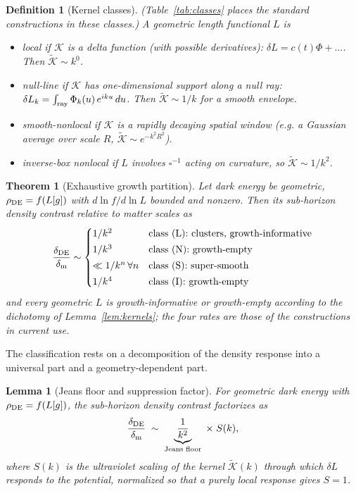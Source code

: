 \documentclass[twocolumn,10pt]{article}
\newtheorem{theorem}{Theorem}
\newtheorem{lemma}{Lemma}
\newtheorem{definition}{Definition}
\newcommand{\dDE}{\delta_{\rm DE}}
\newcommand{\dm}{\delta_{\rm m}}
\begin{document}
\begin{definition}[Kernel classes]
(Table~\ref{tab:classes} places the standard constructions in these classes.)
A geometric length functional $L$ is
\begin{itemize}
\item[\textbf{(L)}] \emph{local} if $\mathcal K$ is a delta function (with
possible derivatives): $\delta L=c(t)\Phi+\dots$. Then
$\widetilde{\mathcal K}\sim k^0$.
\item[\textbf{(N)}] \emph{null-line} if $\mathcal K$ has one-dimensional support
along a null ray: $\delta L_k=\int_{\rm ray}\Phi_k(u)\,e^{iku}\,du$. Then
$\widetilde{\mathcal K}\sim 1/k$ for a smooth envelope.
\item[\textbf{(S)}] \emph{smooth-nonlocal} if $\mathcal K$ is a rapidly
decaying spatial window (e.g. a Gaussian average over scale $R$,
$\widetilde{\mathcal K}\sim e^{-k^2R^2}$).
\item[\textbf{(I)}] \emph{inverse-box nonlocal} if $L$ involves
$\square^{-1}$ acting on curvature, so $\widetilde{\mathcal K}\sim 1/k^2$.
\end{itemize}
\end{definition}

\begin{theorem}[Exhaustive growth partition]
\label{thm:partition}
Let dark energy be geometric, $\rho_{\rm DE}=f(L[g])$ with $d\ln f/d\ln L$
bounded and nonzero. Then its sub-horizon density contrast relative to matter
scales as
\begin{equation}
\frac{\dDE}{\dm}\sim
\begin{cases}
1/k^{2} & \text{class (L): clusters, growth-informative}\\[2pt]
1/k^{3} & \text{class (N): growth-empty}\\[2pt]
\text{$\ll 1/k^{n}\,\forall n$} & \text{class (S): super-smooth}\\[2pt]
1/k^{4} & \text{class (I): growth-empty}
\end{cases}
\label{eq:partition}
\end{equation}
and every geometric $L$ is growth-informative or growth-empty according to the
dichotomy of Lemma~\ref{lem:kernels}; the four rates are those of the
constructions in current use.
\end{theorem}

The classification rests on a decomposition of the density response into a
universal part and a geometry-dependent part.

\begin{lemma}[Jeans floor and suppression factor]
\label{lem:factor}
For geometric dark energy with $\rho_{\rm DE}=f(L[g])$, the sub-horizon
density contrast factorizes as
\begin{equation}
\frac{\dDE}{\dm}\;\sim\;\underbrace{\frac{1}{k^{2}}}_{\text{Jeans floor}}\;\times\;S(k),
\label{eq:factor}
\end{equation}
where $S(k)$ is the ultraviolet scaling of the kernel $\widetilde{\mathcal
K}(k)$ through which $\delta L$ responds to the potential, normalized so that a
purely local response gives $S=1$.
\end{lemma}
\end{document}
